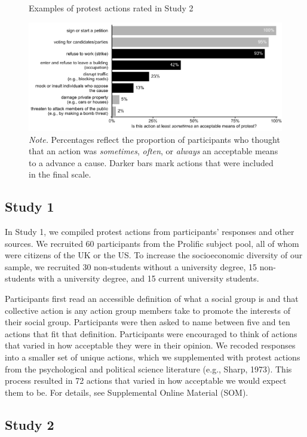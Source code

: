 \documentclass[12pt, letterpaper]{article}
\begin{document}
\begin{figure}[!t]
\centering
\caption{Examples of protest actions rated in Study 2}
\includegraphics[scale=1]{../Scale Development/figures/figure-2}
\caption*{\textit{Note.} Percentages reflect the proportion of participants who thought that an action was \textit{sometimes}, \textit{often}, or \textit{always} an acceptable means to a advance a cause. Darker bars mark actions that were included in the final scale.}
\label{fig:f2}
\end{figure}

\hypertarget{study-1}{%
\subsection{Study 1}\label{study-1}}

In Study 1, we compiled protest actions from participants' responses and
other sources. We recruited 60 participants from the Prolific subject
pool, all of whom were citizens of the UK or the US. To increase the
socioeconomic diversity of our sample, we recruited 30 non-students
without a university degree, 15 non-students with a university degree,
and 15 current university students.

Participants first read an accessible definition of what a social group
is and that collective action is any action group members take to
promote the interests of their social group. Participants were then
asked to name between five and ten actions that fit that definition.
Participants were encouraged to think of actions that varied in how
acceptable they were in their opinion. We recoded responses into a
smaller set of unique actions, which we supplemented with protest
actions from the psychological and political science literature (e.g.,
Sharp, 1973). This process resulted in 72 actions that varied in how
acceptable we would expect them to be. For details, see Supplemental
Online Material (SOM).

\hypertarget{study-2}{%
\subsection{Study 2}\label{study-2}}
\end{document}

